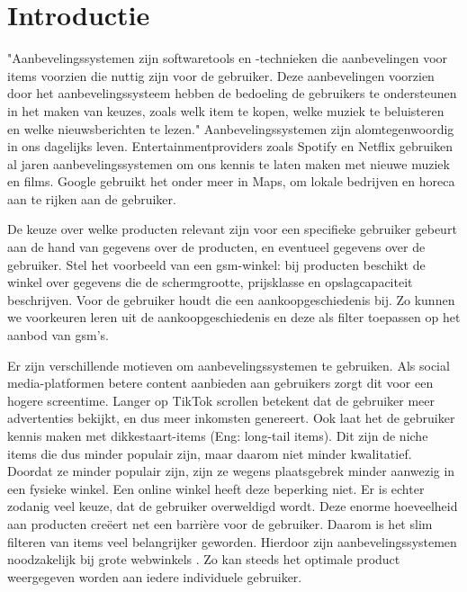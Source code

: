 \chapter{Introductie}

"Aanbevelingssystemen zijn softwaretools en -technieken die aanbevelingen voor items voorzien die nuttig zijn voor de gebruiker. Deze aanbevelingen voorzien door het aanbevelingssysteem hebben de bedoeling de gebruikers te ondersteunen in het maken van keuzes, zoals welk item te kopen, welke muziek te beluisteren en welke nieuwsberichten te lezen." \cite{recsys_handbook}
Aanbevelingssystemen zijn alomtegenwoordig in ons dagelijks leven. Entertainmentproviders zoals Spotify en Netflix gebruiken al jaren aanbevelingssystemen om ons kennis te laten maken met nieuwe muziek en films. Google gebruikt het onder meer in Maps, om lokale bedrijven en horeca aan te rijken aan de gebruiker.

De keuze over welke producten relevant zijn voor een specifieke gebruiker gebeurt aan de hand van gegevens over de producten, en eventueel gegevens over de gebruiker. Stel het voorbeeld van een gsm-winkel: bij producten beschikt de winkel over gegevens die de schermgrootte, prijsklasse en opslagcapaciteit beschrijven. Voor de gebruiker houdt die een aankoopgeschiedenis bij. Zo kunnen we voorkeuren leren uit de aankoopgeschiedenis en deze als filter toepassen op het aanbod van gsm's.

Er zijn verschillende motieven om aanbevelingssystemen te gebruiken. Als social media-platformen betere content aanbieden aan gebruikers zorgt dit voor een hogere screentime. Langer op TikTok scrollen betekent dat de gebruiker meer advertenties bekijkt, en dus meer inkomsten genereert. \cite{tiktokalgorithm}
Ook laat het de gebruiker kennis maken met dikkestaart-items (Eng: long-tail items). Dit zijn de niche items die dus minder populair zijn, maar daarom niet minder kwalitatief. Doordat ze minder populair zijn, zijn ze wegens plaatsgebrek minder aanwezig in een fysieke winkel. Een online winkel heeft deze beperking niet. Er is echter zodanig veel keuze, dat de gebruiker overweldigd wordt. Deze enorme hoeveelheid aan producten creëert net een barrière voor de gebruiker. \cite{paradox_choice} Daarom is het slim filteren van items veel belangrijker geworden. Hierdoor zijn aanbevelingssystemen noodzakelijk bij grote webwinkels \cite{rise_of_recsys_in_ecommerce}. Zo kan steeds het optimale product weergegeven worden aan iedere individuele gebruiker. \cite{cursus_hs2}

